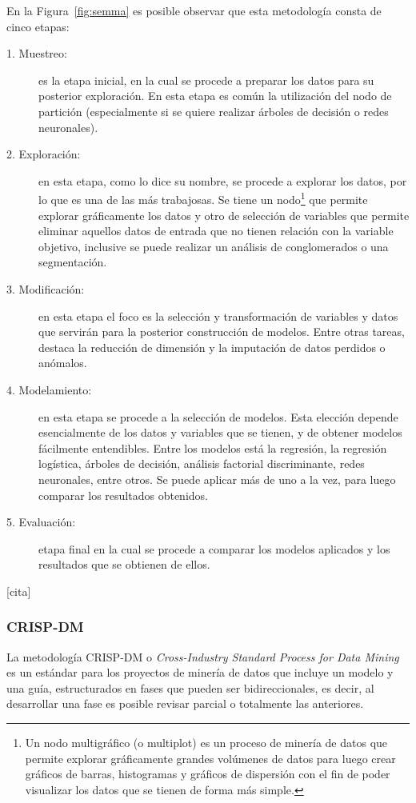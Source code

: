 En la Figura~\ref{fig:semma} es posible observar que esta metodología consta de cinco etapas:
\begin{description}
  \item[1. Muestreo:] es la etapa inicial, en la cual se procede a preparar los datos para su posterior exploración. En esta etapa es común la utilización del nodo de partición (especialmente si se quiere realizar árboles de decisión o redes neuronales). 
  \item[2. Exploración:] en esta etapa, como lo dice su nombre, se procede a explorar los datos, por lo que es una de las más trabajosas. Se tiene un nodo\footnote{Un nodo multigráfico (o multiplot) es un proceso de minería de datos que permite explorar gráficamente grandes volúmenes de datos para luego crear gráficos de barras, histogramas y gráficos de dispersión con el fin de poder visualizar los datos que se tienen de forma más simple.} que permite explorar gráficamente los datos y otro de selección de variables que permite eliminar aquellos datos de entrada que no tienen relación con la variable objetivo, inclusive se puede realizar un análisis de conglomerados o una segmentación.
  \item[3. Modificación:] en esta etapa el foco es la selección y transformación de variables y datos que servirán para la posterior construcción de modelos. Entre otras tareas, destaca la reducción de dimensión y la imputación de datos perdidos o anómalos.
  \item[4. Modelamiento:] en esta etapa se procede a la selección de modelos. Esta elección depende esencialmente de los datos y variables que se tienen, y de obtener modelos fácilmente entendibles. Entre los modelos está la regresión, la regresión logística, árboles de decisión, análisis factorial discriminante, redes neuronales, entre otros. Se puede aplicar más de uno a la vez, para luego comparar los resultados obtenidos.
  \item[5. Evaluación:] etapa final en la cual se procede a comparar los modelos aplicados y los resultados que se obtienen de ellos. 
\end{description}
[cita]

\subsubsection{CRISP-DM}
La metodología CRISP-DM o \textit{Cross-Industry Standard Process for Data Mining} es un estándar para los proyectos de minería de datos que incluye un modelo y una guía, estructurados en fases que pueden ser bidireccionales, es decir, al desarrollar una fase es posible revisar parcial o totalmente las anteriores. 

